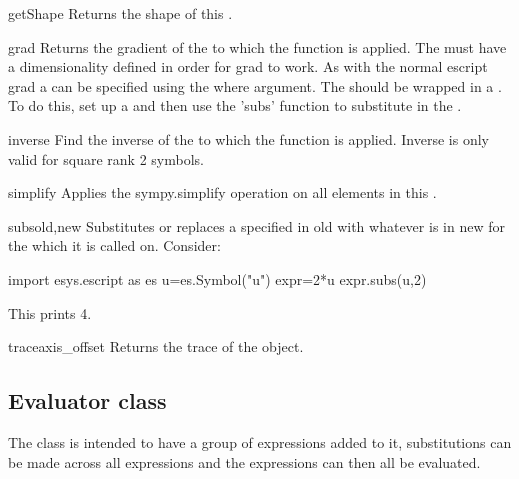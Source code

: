 \begin{methoddesc}[Symbol]{getShape}{}
Returns the shape of this \SYMBOL.
\end{methoddesc}
\pagebreak
\begin{methoddesc}[Symbol]{grad}{}
Returns the gradient of the \SYMBOL to which the function is applied. The \SYMBOL must have a dimensionality defined in order for grad to work. As with the normal escript grad a \FunctionSpace can be specified using the where argument. The \FunctionSpace should be wrapped in a \SYMBOL. To do this, set up a \SYMBOL and then use the 'subs' function to substitute in the \FunctionSpace.
\end{methoddesc}
\begin{methoddesc}[Symbol]{inverse}{}
Find the inverse of the \SYMBOL to which the function is applied. Inverse is only valid for square rank 2 symbols.
\end{methoddesc}
\begin{methoddesc}[Symbol]{simplify}{}
Applies the sympy.simplify operation on all elements in this \SYMBOL.
\end{methoddesc}
\begin{methoddesc}[Symbol]{subs}{old,new}
Substitutes or replaces a \SYMBOL specified in old with whatever is in new for the \SYMBOL which it is called on. Consider:
  \begin{python}
     import esys.escript as es
     u=es.Symbol("u")
     expr=2*u
     expr.subs(u,2)
\end{python}
This prints 4.
\end{methoddesc}
\begin{methoddesc}[Symbol]{trace}{axis_offset}
Returns the trace of the \SYMBOL object.
\end{methoddesc}


\subsection{Evaluator class}
The \EVALUATOR class is intended to have a group of expressions added to it, substitutions can be made across all expressions and the expressions can then all be evaluated.
